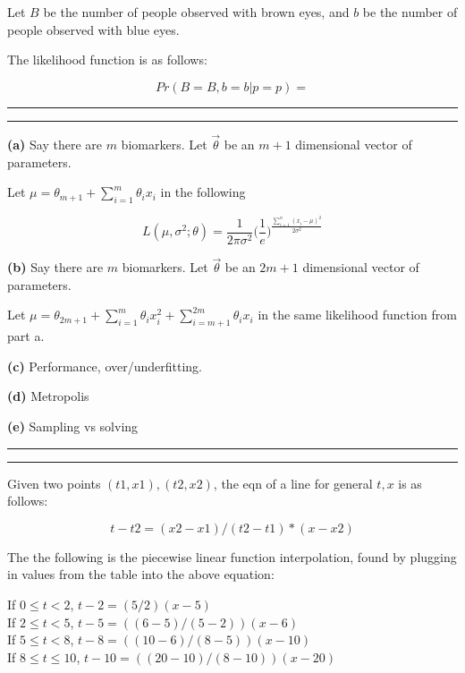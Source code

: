 \documentclass[11pt,letterpaper]{article}
\newcommand{\question}[1] {\vspace{.25in} \hrule\vspace{0.5em}
\noindent{\bf #1} \vspace{0.5em}
\hrule \vspace{.10in}}
\renewcommand{\part}[1] {\vspace{.10in} {\bf (#1)}}
\begin{document}
Let $B$ be the number of people observed with brown eyes,
and $b$ be the number of people observed with blue eyes.

The likelihood function is as follows:

$$Pr(B=B, b=b | p=p) = $$

\question{2}

\part{a}
Say there are $m$ biomarkers. Let $\vec{\theta}$ be an $m+1$ dimensional vector of parameters.

Let $\mu =  \theta_{m+1} + \sum_{i=1}^{m} \theta_i x_i $ in the following

$$L(\mu, \sigma^2; \theta) = \frac{1}{2\pi\sigma^2} \bigg(\frac{1}{e}\bigg)^\frac{\sum_{i=1}^{n} (x_i-\mu)^2}{2\sigma^2}$$

\part{b}
Say there are $m$ biomarkers. Let $\vec{\theta}$ be an $2m+1$ dimensional vector of parameters.

Let $\mu =  \theta_{2m+1} + \sum_{i=1}^{m} \theta_i x_i^2 + \sum_{i=m+1}^{2m} \theta_i x_i $ in the same likelihood function from part a.

\part{c}
Performance, over/underfitting.

\part{d}
Metropolis

\part{e}
Sampling vs solving

\question{3}
Given two points $(t1,x1),(t2,x2)$, the eqn of a line for general $t,x$ is as follows:

$$t - t2 = (x2 - x1)/(t2 - t1) * (x - x2)$$

The the following is the piecewise linear function interpolation, found by plugging in values from the table into the above equation:

If $0 \leq t < 2$, $t - 2 = (5/2)(x - 5)$\\
If $2 \leq t < 5$, $t - 5 = ((6-5)/(5-2))(x-6)$\\
If $5 \leq t < 8$, $t - 8 = ((10-6)/(8-5))(x-10)$\\
If $8 \leq t \leq 10$, $t - 10 = ((20-10)/(8-10))(x-20)$
\end{document}
